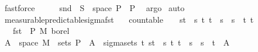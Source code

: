 \begin{isabellebody}
\ fastforce\isanewline
\ \ \isamarkupfalse%
\ \isamarkupfalse%
\ {\isachardoublequoteopen}snd\ {\isacharminus}{\kern0pt}{\isacharbackquote}{\kern0pt}\ S\ {\isasyminter}\ space\ {\isasymSigma}\isactrlsub P\ {\isasymin}\ {\isasymSigma}\isactrlsub P{\isachardoublequoteclose}\ \isamarkupfalse%
\ argo\isanewline
{}\isamarkupfalse%
\ {\isacharparenleft}{\kern0pt}auto{\isacharparenright}{\kern0pt}%
\endisatagproof
{\isafoldproof}%
%
\isadelimproof
\isanewline
%
\endisadelimproof
\isanewline
{}\isamarkupfalse%
\ measurable{\isacharunderscore}{\kern0pt}predictable{\isacharunderscore}{\kern0pt}sigma{\isacharunderscore}{\kern0pt}fst{\isacharcolon}{\kern0pt}\isanewline
\ \ \ {\isachardoublequoteopen}countable\ {\isasymI}{\isachardoublequoteclose}\ {\isachardoublequoteopen}{\isasymI}\ {\isasymsubseteq}\ {\isacharbraceleft}{\kern0pt}{\isacharbraceleft}{\kern0pt}s{\isacharless}{\kern0pt}{\isachardot}{\kern0pt}{\isachardot}{\kern0pt}t{\isacharbraceright}{\kern0pt}\ {\isacharbar}{\kern0pt}\ s\ t{\isachardot}{\kern0pt}\ t\ {\isasymle}\ s\ {\isasymand}\ s\ {\isacharless}{\kern0pt}\ t{\isacharbraceright}{\kern0pt}{\isachardoublequoteclose}\ {\isachardoublequoteopen}{\isacharbraceleft}{\kern0pt}t\ {\isasymsubseteq}\ {\isacharparenleft}{\kern0pt}{\isasymUnion}{\isasymI}{\isacharparenright}{\kern0pt}{\isachardoublequoteclose}\isanewline
\ \ \ {\isachardoublequoteopen}fst\ {\isasymin}\ {\isasymSigma}\isactrlsub P\ {\isasymrightarrow}\isactrlsub M\ borel{\isachardoublequoteclose}\isanewline
%
\isadelimproof
%
\endisadelimproof
%
\isatagproof
{}\isamarkupfalse%
\ {\isacharminus}{\kern0pt}\isanewline
\ \ \isamarkupfalse%
\ {\isachardoublequoteopen}A\ {\isasymtimes}\ space\ M\ {\isasymin}\ sets\ {\isasymSigma}\isactrlsub P{\isachardoublequoteclose}\ \ {\isachardoublequoteopen}A\ {\isasymin}\ sigma{\isacharunderscore}{\kern0pt}sets\ {\isacharbraceleft}{\kern0pt}t\ {\isacharbraceleft}{\kern0pt}{\isacharbraceleft}{\kern0pt}s{\isacharless}{\kern0pt}{\isachardot}{\kern0pt}{\isachardot}{\kern0pt}t{\isacharbraceright}{\kern0pt}\ {\isacharbar}{\kern0pt}\ s\ t{\isachardot}{\kern0pt}\ t\ {\isasymle}\ s\ {\isasymand}\ s\ {\isacharless}{\kern0pt}\ t{\isacharbraceright}{\kern0pt}{\isachardoublequoteclose}\ \ A\ \isamarkupfalse%

\end{isabellebody}
